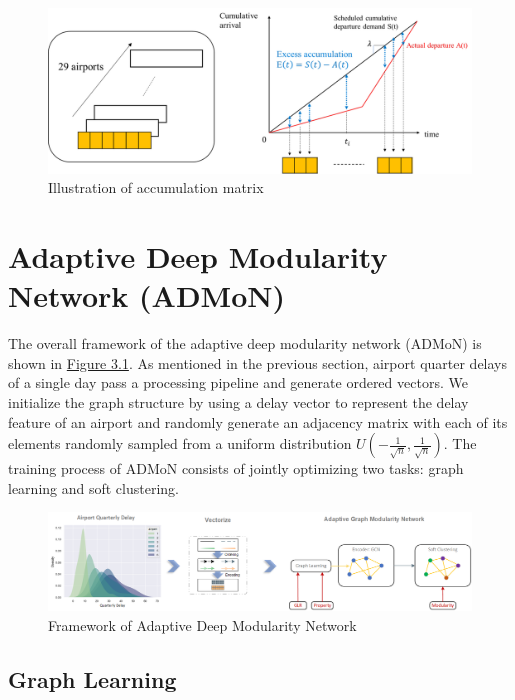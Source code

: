 \begin{figure}[thbp]
    \label{fig:accumulation matrix}
    \centering
    \includegraphics[width=\textwidth]{img/accumulation matrix.png}
    \caption{Illustration of accumulation matrix}
\end{figure}



\section{Adaptive Deep Modularity Network (ADMoN)}

The overall framework of the adaptive deep modularity network (ADMoN) is shown in \hyperref[fig:3-1]{Figure 3.1}. As mentioned in the previous section, airport quarter delays of a single day pass a processing pipeline and generate ordered vectors. We initialize the graph structure by using a delay vector to represent the delay feature of an airport and randomly generate an adjacency matrix with each of its elements randomly sampled from a uniform distribution $U(-\frac{1}{\sqrt{n}},\frac{1}{\sqrt{n}})$. The training process of ADMoN consists of jointly optimizing two tasks: graph learning and soft clustering.

\begin{figure}[thbp]
    \label{fig:3-1}
    \centering
    \includegraphics[width=\textwidth]{img/admon.png}
    \caption{Framework of Adaptive Deep Modularity Network}
\end{figure}

\subsection{Graph Learning}

